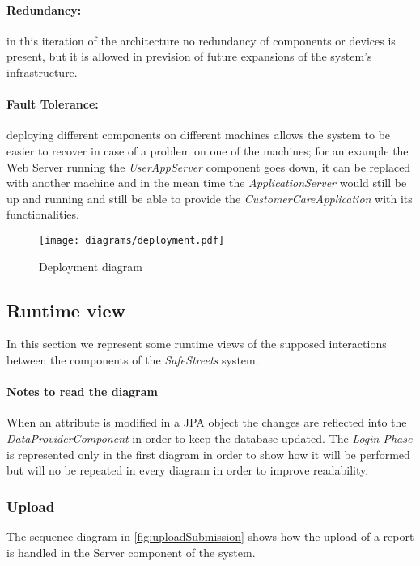 \paragraph{Redundancy:}in this iteration of the architecture no redundancy of components or devices is present, but it is allowed in prevision of future expansions of the system's infrastructure.
\paragraph{Fault Tolerance:}deploying different components on different machines allows the system to be easier to recover in case of a problem on one of the machines; for an example the Web Server running the \textit{UserAppServer} component goes down, it can be replaced with another machine and in the mean time the \textit{ApplicationServer} would still be up and running and still be able to provide the \textit{CustomerCareApplication} with its functionalities.
\clearpage
{}
\begin{figure}[t!]
	\centering
	\texttt{[image: diagrams/deployment.pdf]}
	\caption{
		\label{fig:deployment} 
		Deployment diagram
	}
\end{figure}

\clearpage
\subsection{Runtime view}
In this section we represent some runtime views of the supposed interactions between the components of the \emph{SafeStreets} system.

\paragraph{Notes to read the diagram} When an attribute is modified in a JPA object the changes are reflected into the
	\emph{DataProviderComponent} in order to keep the database updated. 	The \emph{Login Phase} is represented only in the first diagram in order to show how it will be performed but will no be 
	repeated in every diagram in order to improve readability.

\subsubsection{Upload}

	\label{sec:uploadRunView}
	The sequence diagram in \autoref{fig:uploadSubmission} shows how the upload of a report is handled in the Server component of the system.

